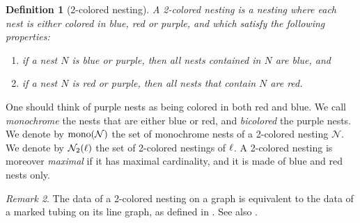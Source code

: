 \documentclass[twoside, 12pt]{amsart}
\newtheorem{definition}{Definition}[section]
\theoremstyle{remark}
\newtheorem{remark}[definition]{\sc Remark}
\begin{document}
\begin{definition}[2-colored nesting] 
A \emph{2-colored nesting} is a nesting where each nest is either colored in blue, red or purple, and which satisfy the following properties: 
\begin{enumerate}[leftmargin=*]
\item if a nest $N$ is blue or purple, then all nests contained in $N$ are blue, and 
\item if a nest $N$ is red or purple, then all nests that contain $N$ are red.
\end{enumerate}
\end{definition}
One should think of purple nests as being colored in both red and blue. 
We call \emph{monochrome} the nests that are either blue or red, and \emph{bicolored} the purple nests. 
We denote by $\mathrm{mono}(\mathcal{N})$ the set of monochrome nests of a 2-colored nesting $\mathcal{N}$.
We denote by $\mathcal{N}_2(\ell)$ the set of 2-colored nestings of $\ell$.
A 2-colored nesting is moreover \emph{maximal} if it has maximal cardinality, and it is made of blue and red nests only. 

\begin{remark} 
The data of a 2-colored nesting on a graph is equivalent to the data of a marked tubing on its line graph, as defined in \cite{DevadossForcey08}. See also \cite[Remark 2.4]{LA21}.
\end{remark}
\end{document}
